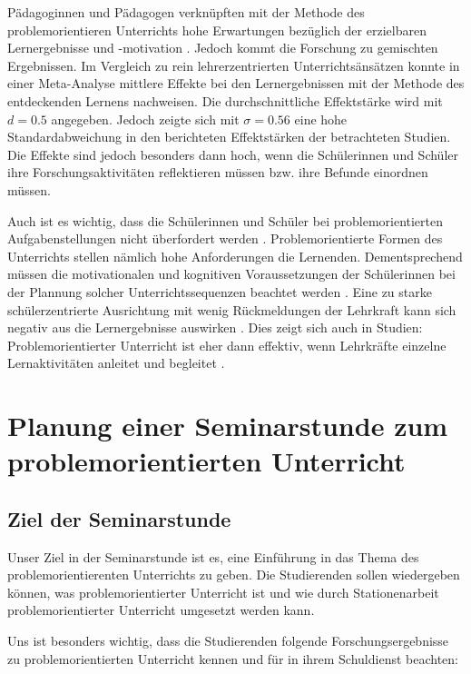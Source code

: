 \documentclass[man,12pt,a4paper]{apa6}
\begin{document}
Pädagoginnen und Pädagogen verknüpften mit der Methode des problemorientieren Unterrichts hohe Erwartungen bezüglich der erzielbaren Lernergebnisse und -motivation \parencite{kunter2013}. Jedoch kommt die Forschung zu gemischten Ergebnissen. Im Vergleich zu rein lehrerzentrierten Unterrichtsänsätzen konnte \textcite{furtak2012} in einer Meta-Analyse mittlere Effekte bei den Lernergebnissen mit der Methode des entdeckenden Lernens nachweisen. Die durchschnittliche Effektstärke wird mit $d=0.5$ angegeben. Jedoch zeigte sich mit $\sigma = 0.56$ eine hohe Standardabweichung in den berichteten Effektstärken der betrachteten Studien. Die Effekte sind jedoch besonders dann hoch, wenn die Schülerinnen und Schüler ihre Forschungsaktivitäten reflektieren müssen bzw. ihre Befunde einordnen müssen.

Auch ist es wichtig, dass die Schülerinnen und Schüler bei problemorientierten Aufgabenstellungen nicht überfordert werden \parencite{kunter2013}. Problemorientierte Formen des Unterrichts stellen nämlich hohe Anforderungen die Lernenden. Dementsprechend müssen die motivationalen und kognitiven Voraussetzungen der Schülerinnen bei der Plannung solcher Unterrichtssequenzen beachtet werden \parencite{kunter2013}. Eine zu starke schülerzentrierte Ausrichtung mit wenig Rückmeldungen der Lehrkraft kann sich negativ aus die Lernergebnisse auswirken \parencite{kunter2013}. Dies zeigt sich auch in Studien: Problemorientierter Unterricht ist eher dann effektiv, wenn Lehrkräfte einzelne Lernaktivitäten anleitet und begleitet \parencite{furtak2012}.

\section{Planung einer Seminarstunde zum problemorientierten Unterricht}

\subsection{Ziel der Seminarstunde}

Unser Ziel in der Seminarstunde ist es, eine Einführung in das Thema des problemorientierenten Unterrichts zu geben. Die Studierenden sollen wiedergeben können, was problemorientierter Unterricht ist und wie durch Stationenarbeit problemorientierter Unterricht umgesetzt werden kann.

Uns ist besonders wichtig, dass die Studierenden folgende Forschungsergebnisse zu problemorientierten Unterricht kennen und für in ihrem Schuldienst beachten:
\end{document}
